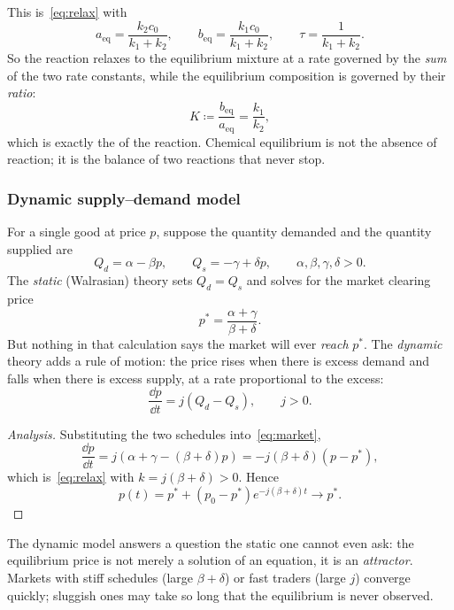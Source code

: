 \begin{observation}
	This is~\eqref{eq:relax} with
	\[
		a_{\mathrm{eq}} = \frac{k_2 c_0}{k_1 + k_2},
		\qquad
		b_{\mathrm{eq}} = \frac{k_1 c_0}{k_1 + k_2},
		\qquad
		\tau = \frac{1}{k_1 + k_2}.
	\]
	So the reaction relaxes to the equilibrium mixture at a rate governed by the
	\emph{sum} of the two rate constants, while the equilibrium composition is governed by
	their \emph{ratio}:
	\[
		K \coloneq \frac{b_{\mathrm{eq}}}{a_{\mathrm{eq}}} = \frac{k_1}{k_2},
	\]
	which is exactly the  of the reaction. Chemical
	equilibrium is not the absence of reaction; it is the balance of two reactions that
	never stop.
\end{observation}

\subsubsection*{Dynamic supply--demand model}

\begin{eg}
	For a single good at price \(p\), suppose the quantity demanded and the quantity
	supplied are
	\[
		Q_d = \alpha - \beta p, \qquad Q_s = -\gamma + \delta p,
		\qquad \alpha, \beta, \gamma, \delta > 0.
	\]
	The \emph{static} (Walrasian) theory sets \(Q_d = Q_s\) and solves for the market
	clearing price
	\[
		p^{*} = \frac{\alpha + \gamma}{\beta + \delta}.
	\]
	But nothing in that calculation says the market will ever \emph{reach} \(p^{*}\). The
	\emph{dynamic} theory adds a rule of motion: the price rises when there is excess
	demand and falls when there is excess supply, at a rate proportional to the excess:
	\begin{equation}\label{eq:market}
		\frac{\dd p}{\dd t} = j\left( Q_d - Q_s \right), \qquad j > 0.
	\end{equation}
\end{eg}

\begin{proof}[Analysis]
	Substituting the two schedules into~\eqref{eq:market},
	\[
		\frac{\dd p}{\dd t}
		= j\left( \alpha + \gamma - (\beta + \delta) p \right)
		= -j(\beta+\delta)\left( p - p^{*} \right),
	\]
	which is~\eqref{eq:relax} with \(k = j(\beta+\delta) > 0\). Hence
	\[
		p(t) = p^{*} + \left( p_0 - p^{*} \right) e^{-j(\beta+\delta) t}
		\longrightarrow p^{*}.
	\]
\end{proof}

\begin{moral}
	The dynamic model answers a question the static one cannot even ask: the equilibrium
	price is not merely a solution of an equation, it is an \emph{attractor}. Markets
	with stiff schedules (large \(\beta + \delta\)) or fast traders (large \(j\)) converge
	quickly; sluggish ones may take so long that the equilibrium is never observed.
\end{moral}

